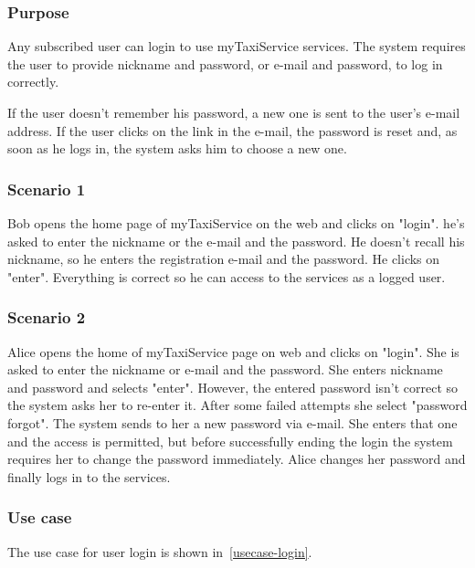 \label{user-login}
\subsubsection{Purpose}
Any subscribed user can login to use myTaxiService services.
The system requires the user to provide nickname and password, or e-mail and password, to log in correctly.

If the user doesn't remember his password, a new one is sent to the user's e-mail address. If the user clicks on the link in the e-mail, the password is reset and, as soon as he logs in, the system asks him to choose a new one. 

\subsubsection{Scenario 1}
Bob opens the home page of myTaxiService on the web and clicks on "login". 
he's asked to enter the nickname or the e-mail and the password. He doesn't recall his nickname, so he enters the registration e-mail and the password. He clicks on "enter". 
Everything is correct so he can access to the services as a logged user.

\subsubsection{Scenario 2}
Alice opens the home of myTaxiService page on web and clicks on "login".  
She is asked to enter the nickname or e-mail and the password.
She enters nickname and password and selects "enter". However, the entered password isn't correct so the system asks her to re-enter it. 
After some failed attempts she select "password forgot".
The system sends to her a new password via e-mail. She enters that one and the access is permitted, but before successfully ending the login the system requires her to change the password immediately. 
Alice changes her password and finally logs in to the services.



\subsubsection{Use case}
The use case for user login is shown in~\autoref{usecase-login}.

